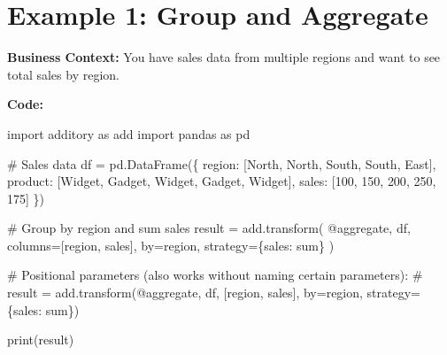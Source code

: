 \documentclass[
  letterpaper,
]{scrbook}
\newenvironment{Shaded}{\begin{snugshade}}{\end{snugshade}}
\newcommand{\BuiltInTok}[1]{\textcolor[rgb]{0.00,0.23,0.31}{#1}}
\newcommand{\CommentTok}[1]{\textcolor[rgb]{0.37,0.37,0.37}{#1}}
\newcommand{\DecValTok}[1]{\textcolor[rgb]{0.68,0.00,0.00}{#1}}
\newcommand{\ImportTok}[1]{\textcolor[rgb]{0.00,0.46,0.62}{#1}}
\newcommand{\NormalTok}[1]{\textcolor[rgb]{0.00,0.23,0.31}{#1}}
\newcommand{\OperatorTok}[1]{\textcolor[rgb]{0.37,0.37,0.37}{#1}}
\newcommand{\StringTok}[1]{\textcolor[rgb]{0.13,0.47,0.30}{#1}}
\begin{document}
\section{Example 1: Group and
Aggregate}\label{example-1-group-and-aggregate}

\textbf{Business Context:} You have sales data from multiple regions and
want to see total sales by region.

\textbf{Code:}

\begin{Shaded}
\begin{Highlighting}[]
\ImportTok{import}\NormalTok{ additory }\ImportTok{as}\NormalTok{ add}
\ImportTok{import}\NormalTok{ pandas }\ImportTok{as}\NormalTok{ pd}

\CommentTok{\# Sales data}
\NormalTok{df }\OperatorTok{=}\NormalTok{ pd.DataFrame(\{}
    \StringTok{\textquotesingle{}region\textquotesingle{}}\NormalTok{: [}\StringTok{\textquotesingle{}North\textquotesingle{}}\NormalTok{, }\StringTok{\textquotesingle{}North\textquotesingle{}}\NormalTok{, }\StringTok{\textquotesingle{}South\textquotesingle{}}\NormalTok{, }\StringTok{\textquotesingle{}South\textquotesingle{}}\NormalTok{, }\StringTok{\textquotesingle{}East\textquotesingle{}}\NormalTok{],}
    \StringTok{\textquotesingle{}product\textquotesingle{}}\NormalTok{: [}\StringTok{\textquotesingle{}Widget\textquotesingle{}}\NormalTok{, }\StringTok{\textquotesingle{}Gadget\textquotesingle{}}\NormalTok{, }\StringTok{\textquotesingle{}Widget\textquotesingle{}}\NormalTok{, }\StringTok{\textquotesingle{}Gadget\textquotesingle{}}\NormalTok{, }\StringTok{\textquotesingle{}Widget\textquotesingle{}}\NormalTok{],}
    \StringTok{\textquotesingle{}sales\textquotesingle{}}\NormalTok{: [}\DecValTok{100}\NormalTok{, }\DecValTok{150}\NormalTok{, }\DecValTok{200}\NormalTok{, }\DecValTok{250}\NormalTok{, }\DecValTok{175}\NormalTok{]}
\NormalTok{\})}

\CommentTok{\# Group by region and sum sales}
\NormalTok{result }\OperatorTok{=}\NormalTok{ add.transform(}
    \StringTok{\textquotesingle{}@aggregate\textquotesingle{}}\NormalTok{,}
\NormalTok{    df,}
\NormalTok{    columns}\OperatorTok{=}\NormalTok{[}\StringTok{\textquotesingle{}region\textquotesingle{}}\NormalTok{, }\StringTok{\textquotesingle{}sales\textquotesingle{}}\NormalTok{],}
\NormalTok{    by}\OperatorTok{=}\StringTok{\textquotesingle{}region\textquotesingle{}}\NormalTok{,}
\NormalTok{    strategy}\OperatorTok{=}\NormalTok{\{}\StringTok{\textquotesingle{}sales\textquotesingle{}}\NormalTok{: }\StringTok{\textquotesingle{}sum\textquotesingle{}}\NormalTok{\}}
\NormalTok{)}

\CommentTok{\# Positional parameters (also works without naming certain parameters):}
\CommentTok{\# result = add.transform(\textquotesingle{}@aggregate\textquotesingle{}, df, [\textquotesingle{}region\textquotesingle{}, \textquotesingle{}sales\textquotesingle{}], by=\textquotesingle{}region\textquotesingle{}, strategy=\{\textquotesingle{}sales\textquotesingle{}: \textquotesingle{}sum\textquotesingle{}\})}

\BuiltInTok{print}\NormalTok{(result)}
\end{Highlighting}
\end{Shaded}
\end{document}
